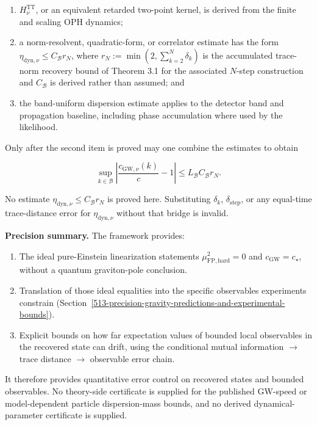 \begin{enumerate}
\def\labelenumi{\arabic{enumi}.}
\tightlist
\item
  \(H_\nu^{\mathrm{TT}}\), or an equivalent retarded two-point kernel, is derived from the finite and scaling OPH dynamics;
\item
  a norm-resolvent, quadratic-form, or correlator estimate has the form
  \(\eta_{\mathrm{dyn},\nu}\le C_{\mathcal B}r_N\), where \(r_N:=\min(2,\sum_{k=2}^N\delta_k)\) is the accumulated trace-norm recovery bound of Theorem 3.1 for the associated \(N\)-step construction and \(C_{\mathcal B}\) is derived rather than assumed; and
\item
  the band-uniform dispersion estimate applies to the detector band and propagation baseline, including phase accumulation where used by the likelihood.
\end{enumerate}

Only after the second item is proved may one combine the estimates to obtain

\[
\sup_{k\in\mathcal B}
\left|\frac{c_{\mathrm{GW},\nu}(k)}{c}-1\right|
\le L_{\mathcal B}C_{\mathcal B}r_N.
\]

No estimate \(\eta_{\mathrm{dyn},\nu}\le C_{\mathcal B}r_N\) is proved here. Substituting \(\delta_k\), \(\delta_{\mathrm{step}}\), or any equal-time trace-distance error for \(\eta_{\mathrm{dyn},\nu}\) without that bridge is invalid.

\textbf{Precision summary.} The framework provides:

\begin{enumerate}
\def\labelenumi{\arabic{enumi}.}
\tightlist
\item
  The ideal pure-Einstein linearization statements \(\mu_{\mathrm{FP,hard}}^2=0\) and
  \(c_{\mathrm{GW}}=c_\star\), without a quantum graviton-pole conclusion.
\item
  Translation of those ideal equalities into the specific observables experiments constrain (Section~\ref{513-precision-gravity-predictions-and-experimental-bounds}).
\item
  Explicit bounds on how far expectation values of bounded local observables in the recovered state can drift, using the conditional mutual information \ensuremath{\to} trace distance \ensuremath{\to} observable error chain.
\end{enumerate}

It therefore provides quantitative error control on recovered states and bounded observables. No theory-side certificate is supplied for the published GW-speed or model-dependent particle dispersion-mass bounds, and no derived dynamical-parameter certificate is supplied.

